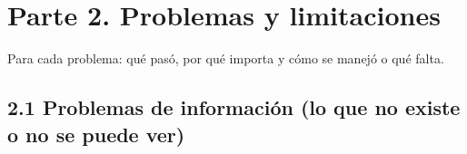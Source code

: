 \documentclass[11pt,letterpaper]{article}
\begin{document}
\clearpage

\section*{Parte 2. Problemas y limitaciones}


Para cada problema: qué pasó, por qué importa y cómo se manejó o qué falta.

\subsection*{2.1 Problemas de información (lo que no existe o no se puede ver)}

\end{document}
